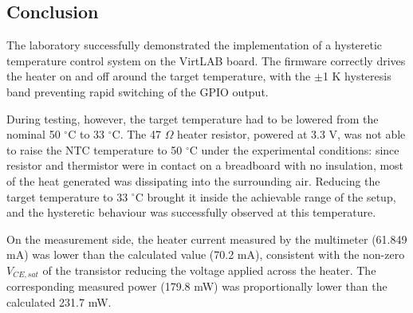 \documentclass[../main.tex]{subfiles}
\begin{document}
\subsection{Conclusion}

The laboratory successfully demonstrated the implementation of a hysteretic temperature control system on the VirtLAB board. The firmware correctly drives the heater on and off around the target temperature, with the $\pm$1 K hysteresis band preventing rapid switching of the GPIO output.

During testing, however, the target temperature had to be lowered from the nominal 50 $^\circ$C to 33 $^\circ$C. The 47 $\Omega$ heater resistor, powered at 3.3 V, was not able to raise the NTC temperature to 50 $^\circ$C under the experimental conditions: since resistor and thermistor were in contact on a breadboard with no insulation, most of the heat generated was dissipating into the surrounding air. Reducing the target temperature to 33 $^\circ$C  brought it inside the achievable range of the setup, and the hysteretic behaviour was successfully observed at this temperature.

On the measurement side, the heater current measured by the multimeter (61.849 mA) was lower than the calculated value (70.2 mA), consistent with the non-zero $V_{CE,{sat}}$ of the transistor reducing the voltage applied across the heater. The corresponding measured power (179.8 mW) was proportionally lower than the calculated 231.7 mW.
\end{document}
